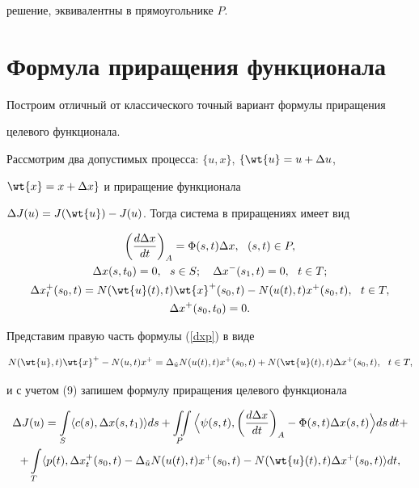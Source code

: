 решение, эквивалентны в прямоугольнике $P$.





\section{Формула приращения функционала}





Построим отличный от классического точный вариант формулы приращения


целевого функционала.


Рассмотрим два допустимых процесса: $\{u,x\}$, $\{\wt{u}=u+\Delta u$,


$\wt{x}=x+\Delta x\}$ и приращение функционала


$\Delta J(u)=J(\wt{u})-J(u)$. Тогда система в приращениях имеет вид


\begin{gather}


\bigg(\frac{d\Delta x}{dt}\bigg)_A=\Phi (s,t)\Delta x,\ \ (s,t)\in P,


\label{delx} \\


%


\Delta x(s,t_0)=0,\ \ s\in S; \quad \Delta x^-(s_1,t)=0,


\ \ t\in T;\notag \\


\Delta x_t^+(s_0,t)=N(\wt{u}(t),t)\wt{x}^+(s_0,t)-N(u(t),t)x^+(s_0,t),


\ \ t\in T,\label{dxp} \\


\Delta x^+(s_0,t_0)=0.\notag


\end{gather}


Представим правую часть формулы (\ref{dxp}) в виде


$$


N(\wt{u},t)\wt{x}^+-N(u,t)x^+=\Delta_{\Tilde{u}}N(u(t),t)x^+


(s_0,t)+N(\wt{u}(t),t)\Delta x^+(s_0,t),\ \ t\in T,


$$


и с учетом (9) запишем формулу приращения целевого функционала


\begin{multline}


\label{delJ}


\Delta J(u)=\int\limits_S\la c(s),\Delta x(s,t_1)\ra ds+ 


\iint\limits_P \Big\la\psi(s,t),


\bigg(\frac{d\Delta x}{dt}\bigg)_A-\Phi (s,t)\Delta 


x(s,t)\Big\ra ds\,dt+ \\


%


+\int\limits_T \la p(t),\Delta x_t^+(s_0,t)-


\Delta_{\Tilde{u}}N(u(t),t)x^+(s_0,t)-


N(\wt{u}(t),t)\Delta x^+(s_0,t)\ra dt,


\end{multline}


